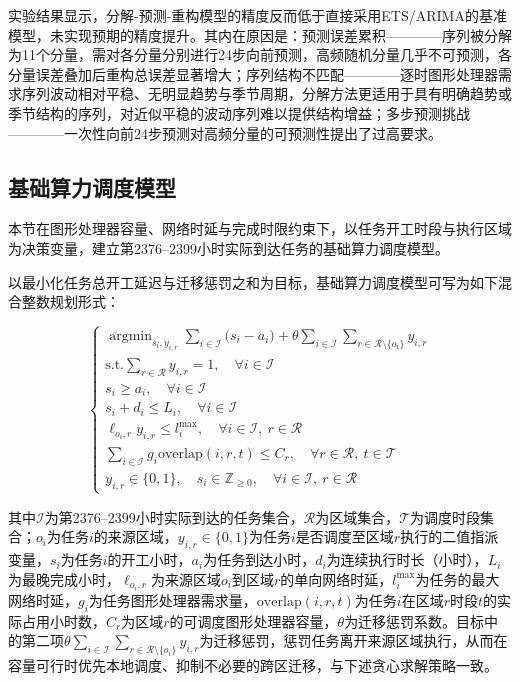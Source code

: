 \documentclass{ctexart}
\DeclareMathOperator*{\argmin}{argmin}
\begin{document}
实验结果显示，分解-预测-重构模型的精度反而低于直接采用ETS/ARIMA的基准模型，未实现预期的精度提升。其内在原因是：预测误差累积————序列被分解为11个分量，需对各分量分别进行24步向前预测，高频随机分量几乎不可预测，各分量误差叠加后重构总误差显著增大；序列结构不匹配————逐时图形处理器需求序列波动相对平稳、无明显趋势与季节周期，分解方法更适用于具有明确趋势或季节结构的序列，对近似平稳的波动序列难以提供结构增益；多步预测挑战————一次性向前24步预测对高频分量的可预测性提出了过高要求。

\subsection{基础算力调度模型}
本节在图形处理器容量、网络时延与完成时限约束下，以任务开工时段与执行区域为决策变量，建立第2376–2399小时实际到达任务的基础算力调度模型。

以最小化任务总开工延迟与迁移惩罚之和为目标，基础算力调度模型可写为如下混合整数规划形式：

\begin{equation}
\begin{cases}
\argmin_{s_{i},y_{i,r}}
\sum_{i\in\mathcal{I}}\big(s_i-a_i\big)+\theta\sum_{i\in\mathcal{I}}\sum_{r\in\mathcal{R}\setminus\{o_i\}}y_{i,r}\\\text{s.t.}\sum_{r\in\mathcal{R}}y_{i,r}=1,\quad\forall i\in\mathcal{I}\\s_i\ge a_i,\quad\forall i\in\mathcal{I}\\s_i+d_i\le L_i,\quad\forall i\in\mathcal{I}\\\ell_{o_i,r}y_{i,r}\le l_i^{\max},\quad\forall i\in\mathcal{I},\ r\in\mathcal{R}\\\sum_{i\in\mathcal{I}}g_i\mathrm{overlap}(i,r,t)\le C_r,\quad\forall r\in\mathcal{R},\ t\in\mathcal{T}\\y_{i,r}\in\{0,1\},\quad s_i\in\mathbb{Z}_{\ge 0},\quad\forall i\in\mathcal{I},\ r\in\mathcal{R}
\end{cases}
\end{equation}

其中$\mathcal{I}$为第2376–2399小时实际到达的任务集合，$\mathcal{R}$为区域集合，$\mathcal{T}$为调度时段集合；$o_i$为任务$i$的来源区域，$y_{i,r}\in\{0,1\}$为任务$i$是否调度至区域$r$执行的二值指派变量，$s_i$为任务$i$的开工小时，$a_i$为任务到达小时，$d_i$为连续执行时长（小时），$L_i$为最晚完成小时，$\ell_{o_i,r}$为来源区域$o_i$到区域$r$的单向网络时延，$l_i^{\max}$为任务的最大网络时延，$g_i$为任务图形处理器需求量，$\mathrm{overlap}(i,r,t)$为任务$i$在区域$r$时段$t$的实际占用小时数，$C_r$为区域$r$的可调度图形处理器容量，$\theta$为迁移惩罚系数。目标中的第二项$\theta\sum_{i\in\mathcal{I}}\sum_{r\in\mathcal{R}\setminus\{o_i\}}y_{i,r}$为迁移惩罚，惩罚任务离开来源区域执行，从而在容量可行时优先本地调度、抑制不必要的跨区迁移，与下述贪心求解策略一致。
\end{document}
